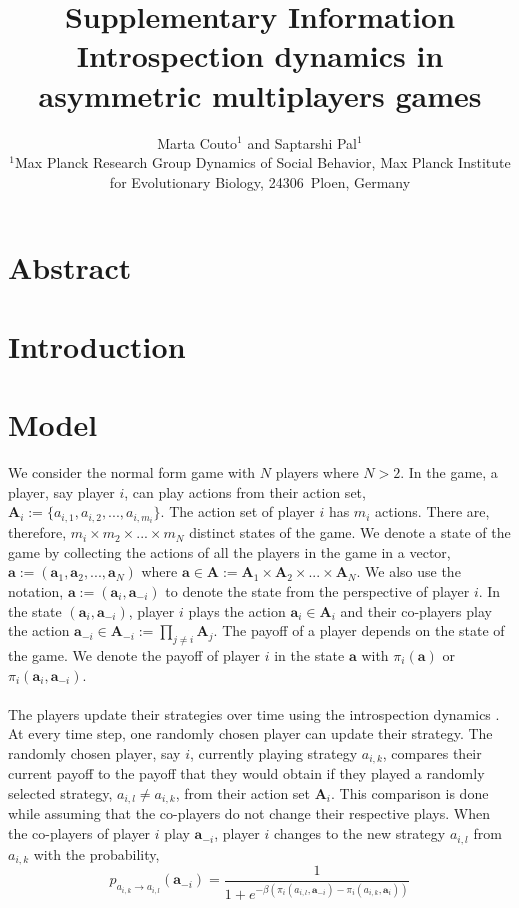\documentclass[11pt]{article}
\title{\sffamily \Large Supplementary Information\\[0.1cm] {\bfseries Introspection dynamics in asymmetric multiplayers games}}
\date{\empty}
\author{\parbox[c]{16cm}{\centering \onehalfspacing \fontsize{11}{12}\selectfont Marta Couto$^1$ and Saptarshi Pal$^1$\\[0.2cm]
$^1$Max Planck Research Group Dynamics of Social Behavior, Max Planck Institute for Evolutionary Biology, 24306~Ploen, Germany}}
\theoremstyle{plainCl1}
\theoremstyle{plainCl2}
\newcommand{\A}{\mathbf{A}}
\newcommand{\abf}{\mathbf{a}}
\begin{document}
\maketitle
\onehalfspacing
\section*{Abstract}
\newpage
\section*{Introduction}
\section*{Model}
We consider the normal form game with $N$ players where $N > 2$. In the game, a player, say player $i$, can play actions from their action set, $\A_i := \{a_{i,1}, a_{i,2}, ..., a_{i,m_i} \}$. The action set of player $i$ has $m_i$ actions. There are, therefore, $m_i \times m_2 \times ... \times m_N$ distinct states of the game. We denote a state of the game by collecting the actions of all the players in the game in a vector, $\abf := (\abf_1, \abf_2, ..., \abf_N)$ where $\abf \in \A := \A_1 \times \A_2 \times ... \times \A_N$. We also use the notation, $\abf := (\abf_i, \abf_{-i})$ to denote the state from the perspective of player $i$. In the state $(\abf_i, \abf_{-i})$, player $i$ plays the action $\abf_i \in \A_i$ and their co-players play the action $\abf_{-i} \in \A_{-i} := \prod_{j \neq i} \A_j$. The payoff of a player depends on the state of the game. We denote the payoff of player $i$ in the state $\abf$ with $\pi_i(\abf)$ or $\pi_i(\abf_i, \abf_{-i})$. \\ \\ 
\noindent The players update their strategies over time using the introspection dynamics \cite{couto2022introspection}. At every time step, one randomly chosen player can update their strategy. The randomly chosen player, say $i$, currently playing strategy $a_{i,k}$, compares their current payoff to the payoff that they would obtain if they played a randomly selected strategy,  $a_{i,l} \neq a_{i,k}$, from their action set $\A_i$. This comparison is done while assuming that the co-players do not change their respective plays. When the co-players of player $i$ play $\abf_{-i}$, player $i$ changes to the new strategy $a_{i,l}$ from $a_{i,k}$ with the probability, \\
\begin{equation}
 p_{a_{i,k} \to a_{i,l}} (\abf_{-i})= \frac{1}{1 + e^{\displaystyle -\beta(\pi_i(a_{i,l}, \abf_{-i}) - \pi_i(a_{i,k}, \abf_{i}))}}
 \label{Eq:introspection-update}
\end{equation}
\end{document}
